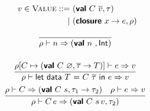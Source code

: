 \documentclass{article}
\def\code#1{\textsf{#1}}
\def\por{\ | \ }
\def\rt{\Rightarrow}
\def\envj#1#2#3{#1 \vdash #2 \rt #3}
\def\closure#1#2#3{(\textsf{\textbf{closure}} \ #1 \to #2,#3)}
\def\val#1#2#3{(\textsf{\textbf{val}} \ #1 \ {#2} , #3 )}
\begin{document}
\begin{align*}
v\in \textsc{Value}::=\ & {\val{C}{\overline{v}}{\tau}} \\
\por & \closure x e \rho
\end{align*}

\begin{gather*}
\infer[]{\envj \rho n {\val{n}{}{\code{Int}}}}{}\\[12pt]
\infer[]{\envj{\rho}{\code{let data $T$ = $C$ $\overline{\tau}$ in $e$}}{v}}{\envj{\rho [C\mapsto \val{C}{\varnothing}{\overline{\tau}\to T}]}{e}{v}}\\
\infer[]{\envj{\rho}{C\, e}{\val{C}{s\, v}{\tau_2}}}{\envj{\rho}{C}{\val{C}{s}{\tau_1\to\tau_2}} & \envj{\rho}{e}{v}}
\end{gather*}
\end{document}
